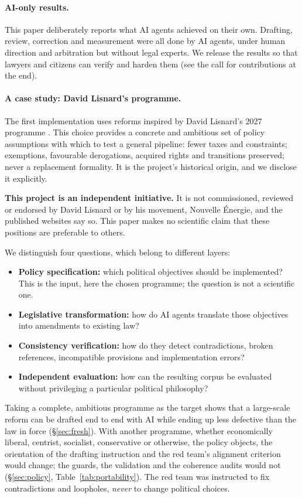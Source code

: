 \documentclass[11pt,a4paper]{article}
\begin{document}
\paragraph{AI-only results.}
This paper deliberately reports what AI agents achieved on their own. Drafting, review, correction and measurement were all done by AI agents, under human direction and arbitration but without legal experts. We release the results so that lawyers and citizens can verify and harden them (see the call for contributions at the end).

\paragraph{A case study: David Lisnard's programme.}
The first implementation uses reforms inspired by David Lisnard's 2027 programme \cite{lisnard}. This choice provides a concrete and ambitious set of policy assumptions with which to test a general pipeline: fewer taxes and constraints; exemptions, favourable derogations, acquired rights and transitions preserved; never a replacement formality. It is the project's historical origin, and we disclose it explicitly.

\textbf{This project is an independent initiative.} It is not commissioned, reviewed or endorsed by David Lisnard or by his movement, Nouvelle Énergie, and the published websites say so. This paper makes no scientific claim that these positions are preferable to others.

We distinguish four questions, which belong to different layers:
\begin{itemize}
  \item \textbf{Policy specification:} which political objectives should be implemented? This is the input, here the chosen programme; the question is not a scientific one.
  \item \textbf{Legislative transformation:} how do AI agents translate those objectives into amendments to existing law?
  \item \textbf{Consistency verification:} how do they detect contradictions, broken references, incompatible provisions and implementation errors?
  \item \textbf{Independent evaluation:} how can the resulting corpus be evaluated without privileging a particular political philosophy?
\end{itemize}
Taking a complete, ambitious programme as the target shows that a large-scale reform can be drafted end to end with AI while ending up less defective than the law in force (\S\ref{sec:fresh}). With another programme, whether economically liberal, centrist, socialist, conservative or otherwise, the policy objects, the orientation of the drafting instruction and the red team's alignment criterion would change; the guards, the validation and the coherence audits would not (\S\ref{sec:policy}, Table~\ref{tab:portability}). The red team was instructed to fix contradictions and loopholes, \emph{never} to change political choices.
\end{document}
